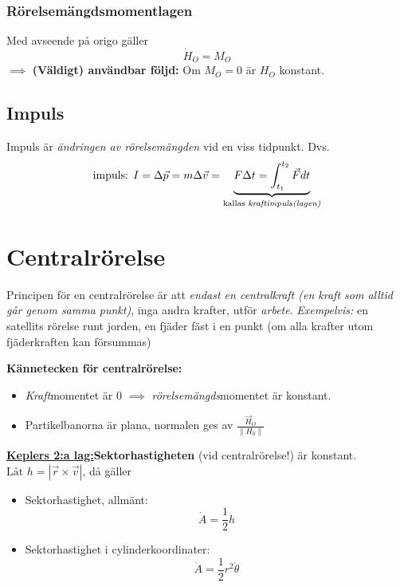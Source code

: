 \documentclass{article}
\newenvironment{ankiflashcard}[1]{}{}
\begin{document}
\begin{paracol}{2}
\begin{ankiflashcard}{Definiera rörelsemängdsmomentlagen.}
\subsubsection{Rörelsemängdsmomentlagen}
Med avseende på origo gäller
$$
\dot H_O = M_O
$$
$\implies$ \textbf{(Väldigt) användbar följd:} Om $M_O=0$ är $H_O$ konstant.
\end{ankiflashcard}


\begin{ankiflashcard}{Definiera vad impuls är. Definiera även kraftimpulslagen.}
    
\subsection{Impuls}
Impuls är \textit{ändringen av rörelsemängden} vid en viss tidpunkt. Dvs.
$$\text{impuls: } I = \Delta \vec p = m \Delta \vec v = \underbrace{F\Delta t =  \int_{t_1}^{t_2} \vec F dt}_{\text{kallas \textit{kraftimpuls(lagen)}}}$$
\end{ankiflashcard}

\begin{ankiflashcard}{Definiera centralrörelse och dess kännetecken.}
    \section{Centralrörelse}
  
    Principen för en centralrörelse är att \textit{endast en centralkraft (en kraft som alltid går genom samma punkt)}, inga andra krafter, utför \textit{arbete}. \textit{Exempelvis:} en satellits rörelse runt jorden, en fjäder fäst i en punkt (om alla krafter utom fjäderkraften kan försummas)

    \textbf{Kännetecken för centralrörelse:}
    \begin{itemize}
        \item \textit{Kraft}momentet är $0$ $\implies$ \textit{rörelsemängds}momentet är konstant. 
        \item Partikelbanorna är plana, normalen ges av $\frac{\vec H_O}{\left\| H_0 \right\|}$
    \end{itemize}
\end{ankiflashcard}

\begin{ankiflashcard}{Definiera sektorhastigheten vid centralrörelse}
    \underline{\textbf{Keplers 2:a lag:}}\textbf{Sektorhastigheten} (vid centralrörelse!) är konstant.
    $\boxed{\text{Låt }h=\left|\vec r \times \vec v\right|}$, då gäller
    \begin{itemize}
        \item Sektorhastighet, allmänt:
        $$\dot A = \frac 1 2 h$$
        \item  Sektorhastighet i cylinderkoordinater:     $$\dot A = \frac 1 2 r^2 \dot \theta$$
    \end{itemize}
\end{ankiflashcard}


\end{paracol}
\end{document}
